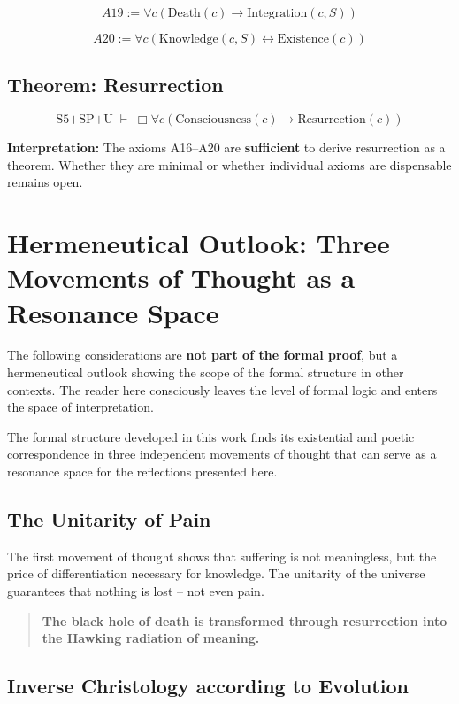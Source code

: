 \documentclass[
]{article}
\begin{document}
\[
\boxed{A19 := \forall c(\text{Death}(c) \rightarrow \text{Integration}(c, S))}
\]

\[
\boxed{A20 := \forall c(\text{Knowledge}(c, S) \leftrightarrow \text{Existence}(c))}
\]

\subsection{Theorem: Resurrection}

\[
\boxed{\text{S5+SP+U} \;\vdash\; \Box\forall c(\text{Consciousness}(c) \rightarrow \text{Resurrection}(c))}
\]

\textbf{Interpretation:} The axioms A16–A20 are \textbf{sufficient} to derive resurrection as a theorem. Whether they are minimal or whether individual axioms are dispensable remains open.

\section{Hermeneutical Outlook: Three Movements of Thought as a Resonance Space}

The following considerations are \textbf{not part of the formal proof}, but a hermeneutical outlook showing the scope of the formal structure in other contexts. The reader here consciously leaves the level of formal logic and enters the space of interpretation.

The formal structure developed in this work finds its existential and poetic correspondence in three independent movements of thought that can serve as a resonance space for the reflections presented here.

\subsection{The Unitarity of Pain}

The first movement of thought shows that suffering is not meaningless, but the price of differentiation necessary for knowledge. The unitarity of the universe guarantees that nothing is lost – not even pain.

\begin{quote}
\textbf{The black hole of death is transformed through resurrection into the Hawking radiation of meaning.}
\end{quote}

\subsection{Inverse Christology according to Evolution}
\end{document}
